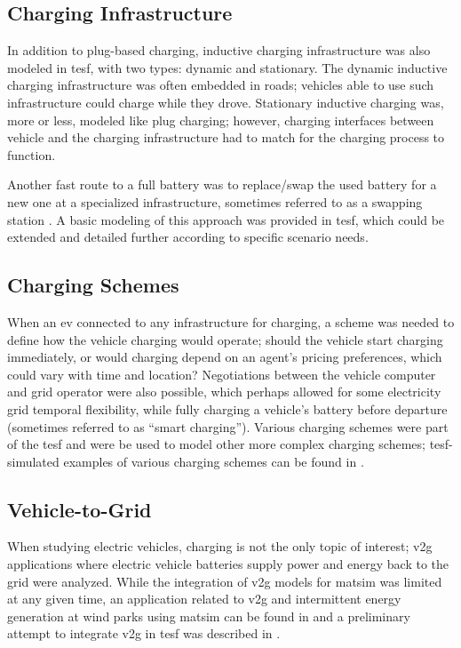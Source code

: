 \subsection{Charging Infrastructure}
In addition to plug-based charging, inductive charging infrastructure was also modeled in \gls{tesf}, with two types: dynamic and stationary. The dynamic inductive charging infrastructure was often embedded in roads; vehicles able to use such infrastructure could charge while they drove. Stationary inductive charging was, more or less, modeled like plug charging; however, charging interfaces between vehicle and the charging infrastructure had to match for the charging process to function.

Another fast route to a full battery was to replace/swap the used battery for a new one at a specialized infrastructure, sometimes referred to as a swapping station \citep[][]{LiEtAl_ACC_2011}. A basic modeling of this approach was provided in \gls{tesf}, which could be extended and detailed further according to specific scenario needs.

\subsection{Charging Schemes}
When an \gls{ev} connected to any infrastructure for charging, a scheme was needed to define how the vehicle charging would operate; should the vehicle start charging immediately, or would charging depend on an agent's pricing preferences, which could vary with time and location? Negotiations between the vehicle computer and grid operator were also possible, which perhaps allowed for some electricity grid temporal flexibility, while fully charging a vehicle's battery before departure (sometimes referred to as ``smart charging''). Various charging schemes were part of the \gls{tesf} and were be used to model other more complex charging schemes; \gls{tesf}-simulated examples of various charging schemes can be found in \citet[][]{WaraichEtAl_TRR_2013}.

\subsection{Vehicle-to-Grid}
When studying electric vehicles, charging is not the only topic of interest; \gls{v2g} applications where electric vehicle batteries supply power and energy back to the grid \citep[][]{KemptonTomic_JPS_2005} were analyzed. While the integration of \gls{v2g} models for \gls{matsim} was limited at any given time, an application related to \gls{v2g} and intermittent energy generation at wind parks using \gls{matsim} can be found in \citet[][]{GalusAndersson_CIGRE_2011} and a preliminary attempt to integrate \gls{v2g} in \gls{tesf} was described in \citet[][]{WaraichEtAl_JanssensEtAl_2014, Schieffer_MastersThesis_2011}.

